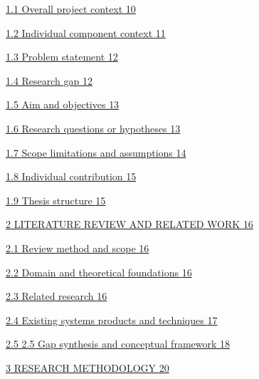 \documentclass[
]{article}
\begin{document}
\protect\hyperlink{overall-project-context}{1.1 Overall project context
\protect\hyperlink{overall-project-context}{10}}

\protect\hyperlink{individual-component-context}{1.2 Individual
component context \protect\hyperlink{individual-component-context}{11}}

\protect\hyperlink{problem-statement}{1.3 Problem statement
\protect\hyperlink{problem-statement}{12}}

\protect\hyperlink{research-gap}{1.4 Research gap
\protect\hyperlink{research-gap}{12}}

\protect\hyperlink{aim-and-objectives}{1.5 Aim and objectives
\protect\hyperlink{aim-and-objectives}{13}}

\protect\hyperlink{research-questions-or-hypotheses}{1.6 Research
questions or hypotheses
\protect\hyperlink{research-questions-or-hypotheses}{13}}

\protect\hyperlink{scope-limitations-and-assumptions}{1.7 Scope
limitations and assumptions
\protect\hyperlink{scope-limitations-and-assumptions}{14}}

\protect\hyperlink{individual-contribution}{1.8 Individual contribution
\protect\hyperlink{individual-contribution}{15}}

\protect\hyperlink{thesis-structure}{1.9 Thesis structure
\protect\hyperlink{thesis-structure}{15}}

\protect\hyperlink{literature-review-and-related-work}{2 LITERATURE
REVIEW AND RELATED WORK
\protect\hyperlink{literature-review-and-related-work}{16}}

\protect\hyperlink{review-method-and-scope}{2.1 Review method and scope
\protect\hyperlink{review-method-and-scope}{16}}

\protect\hyperlink{domain-and-theoretical-foundations}{2.2 Domain and
theoretical foundations
\protect\hyperlink{domain-and-theoretical-foundations}{16}}

\protect\hyperlink{related-research}{2.3 Related research
\protect\hyperlink{related-research}{16}}

\protect\hyperlink{existing-systems-products-and-techniques}{2.4
Existing systems products and techniques
\protect\hyperlink{existing-systems-products-and-techniques}{17}}

\protect\hyperlink{gap-synthesis-and-conceptual-framework}{2.5 2.5 Gap
synthesis and conceptual framework
\protect\hyperlink{gap-synthesis-and-conceptual-framework}{18}}

\protect\hyperlink{research-methodology}{3 RESEARCH METHODOLOGY
\protect\hyperlink{research-methodology}{20}}
\end{document}
